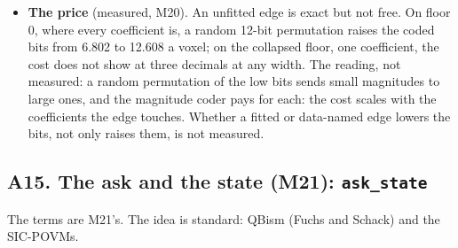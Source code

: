 \begin{itemize}
\item \textbf{The price} (measured, M20). An unfitted edge is exact but not free. On floor 0, where every coefficient is, a random 12-bit permutation raises the coded bits from 6.802 to 12.608 a voxel; on the collapsed floor, one coefficient, the cost does not show at three decimals at any width. The reading, not measured: a random permutation of the low bits sends small magnitudes to large ones, and the magnitude coder pays for each: the cost scales with the coefficients the edge touches. Whether a fitted or data-named edge lowers the bits, not only raises them, is not measured.
\end{itemize}

\subsection{\texorpdfstring{A15. The ask and the state (M21): \texttt{ask\_\allowbreak{}state}}{A15. The ask and the state (M21): ask\_state}}

The terms are M21's. The idea is standard: QBism (Fuchs and Schack) and the SIC-POVMs.

